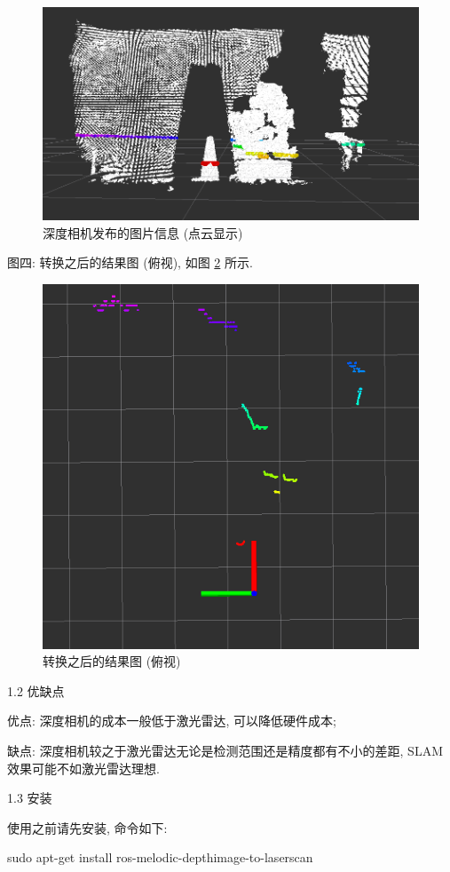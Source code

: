 \documentclass[openany, fontset=windowsold]{ctexbook}
\theoremstyle{kaiti}
\theoremstyle{normal}
\begin{document}
\begin{figure}[!ht]
  \centering
  \includegraphics[width=.8\textwidth]{ros_demo_nav_img_to_scan_03.png}
  \caption{深度相机发布的图片信息 (点云显示)}
  \label{fig:ros_demo_nav_img_to_scan_03}
\end{figure}

图四: 转换之后的结果图 (俯视), 如图 \ref{fig:ros_demo_nav_img_to_scan_04} 所示.

\begin{figure}[!ht]
  \centering
  \includegraphics[width=.5\textwidth]{ros_demo_nav_img_to_scan_04.png}
  \caption{转换之后的结果图 (俯视)}
  \label{fig:ros_demo_nav_img_to_scan_04}
\end{figure}

1.2 优缺点

优点: 深度相机的成本一般低于激光雷达, 可以降低硬件成本; 

缺点: 深度相机较之于激光雷达无论是检测范围还是精度都有不小的差距, SLAM效果可能不如激光雷达理想.

1.3 安装

使用之前请先安装, 命令如下:

\begin{bash}
  sudo apt-get install ros-melodic-depthimage-to-laserscan
\end{bash}
\end{document}
